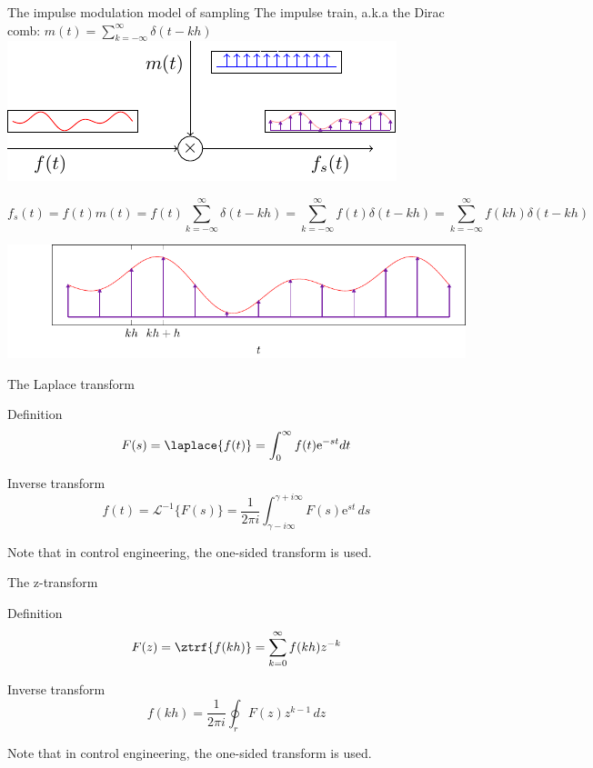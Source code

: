 \documentclass[presentation,aspectratio=169]{beamer}
\begin{document}
\begin{frame}[label={sec:orgc9bf043}]{The impulse modulation model of sampling}
The \alert{impulse train}, a.k.a the \alert{Dirac comb}:
\(m(t) = \sum_{k=-\infty}^{\infty} \delta(t-kh)\)\hspace*{10mm}
\pause
\includegraphics[width=0.4\linewidth]{../../figures/modulation-model-blocks}

\pause

\[f_s(t) = f(t)m(t) = f(t) \sum_{k=-\infty}^{\infty} \delta(t-kh) = \sum_{k=-\infty}^{\infty} f(t)\delta(t-kh) = \sum_{k=-\infty}^{\infty} f(kh) \delta(t-kh) \]


\begin{center}
\includegraphics[width=0.8\linewidth]{../../figures/modulation-model-timeseries}
\end{center}
\end{frame}


\begin{frame}[label={sec:orgf81efd7}]{The Laplace transform}
\begin{block}{Definition}
\[ F(s) = \laplace{f(t)} = \int_0^\infty f(t) \mathrm{e}^{-st} dt\]
\end{block}
\begin{block}{Inverse transform}
\[ f(t) = \mathcal{L}^{-1}\{F(s)\} = \frac{1}{2\pi i} \int_{\gamma - i\infty}^{\gamma + i\infty} F(s)\mathrm{e}^{st} \, ds \]

Note that in control engineering, the one-sided transform is used.
\end{block}
\end{frame}

\begin{frame}[label={sec:orgf60fe11}]{The z-transform}
\begin{block}{Definition}
\[ F(z) = \ztrf{f(kh)} = \sum_{k=0}^{\infty} f(kh)z^{-k} \]
\end{block}

\begin{block}{Inverse transform}
\[ f(kh) = \frac{1}{2\pi i} \oint_r F(z) z^{k-1} \, dz \]

Note that in control engineering, the one-sided transform is used.
\end{block}
\end{frame}
\end{document}
